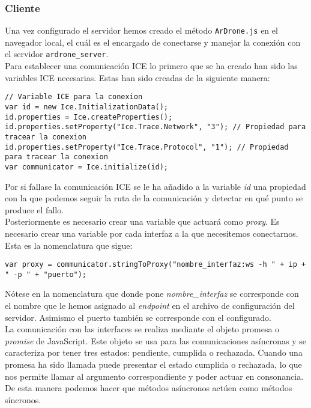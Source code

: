 \subsubsection{Cliente}

Una vez configurado el servidor hemos creado el método \texttt{ArDrone.js} en el navegador local, el cuál es el encargado de conectarse y manejar la conexión con el servidor \texttt{ardrone\_server}.\\

Para establecer una comunicación ICE lo primero que se ha creado han sido las variables ICE necesarias. Estas han sido creadas de la siguiente manera:\\

\begin{lstlisting}[caption=Variables para la conexión ICE.]
// Variable ICE para la conexion
var id = new Ice.InitializationData();
id.properties = Ice.createProperties();
id.properties.setProperty("Ice.Trace.Network", "3"); // Propiedad para tracear la conexion
id.properties.setProperty("Ice.Trace.Protocol", "1"); // Propiedad para tracear la conexion
var communicator = Ice.initialize(id);
\end{lstlisting}

Por si fallase la comunicación ICE se le ha añadido a la variable \emph{id} una propiedad con la que podemos seguir la ruta de la comunicación y detectar en qué punto se produce el fallo.\\

Posteriormente es necesario crear una variable que actuará como \emph{proxy}. Es necesario crear una variable por cada interfaz a la que necesitemos conectarnos. Esta es la nomenclatura que sigue:\\

\begin{lstlisting}[caption=Nomenclatura de variable que actuará como \emph{proxy}]
var proxy = communicator.stringToProxy("nombre_interfaz:ws -h " + ip + " -p " + "puerto");
\end{lstlisting}

Nótese en la nomenclatura que donde pone \emph{nombre\_interfaz} se corresponde con el nombre que le hemos asignado al \emph{endpoint} en el archivo de configuración del servidor. Asimismo el puerto también se corresponde con el configurado.\\


La comunicación con las interfaces se realiza mediante el objeto promesa o \emph{promise} de JavaScript. Este objeto se usa para las comunicaciones asíncronas y se caracteriza por tener tres estados: pendiente, cumplida o rechazada. Cuando una promesa ha sido llamada puede presentar el estado cumplida o rechazada, lo que nos permite llamar al argumento correspondiente y poder actuar en consonancia. De esta manera podemos hacer que métodos asíncronos actúen como métodos síncronos.\\

